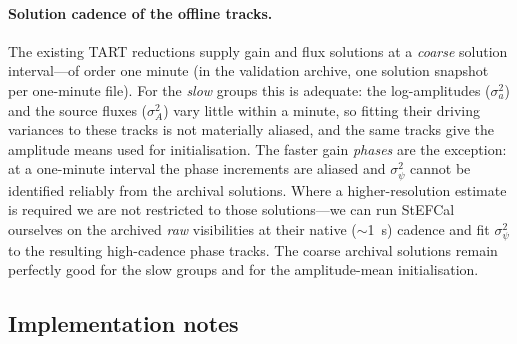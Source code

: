 \documentclass[11pt]{article}
\begin{document}
\paragraph{Solution cadence of the offline tracks.} The existing TART reductions supply gain and
flux solutions at a \emph{coarse} solution interval---of order one minute (in the validation
archive, one solution snapshot per one-minute file). For the \emph{slow} groups this is adequate:
the log-amplitudes ($\sigma_a^2$) and the source fluxes ($\sigma_A^2$) vary little within a minute,
so fitting their driving variances to these tracks is not materially aliased, and the same tracks
give the amplitude means used for initialisation. The faster gain \emph{phases} are the exception:
at a one-minute interval the phase increments are aliased and $\sigma_\psi^2$ cannot be identified
reliably from the archival solutions. Where a higher-resolution estimate is required we are not
restricted to those solutions---we can run StEFCal ourselves on the archived \emph{raw}
visibilities at their native ($\sim$1~s) cadence and fit $\sigma_\psi^2$ to the resulting
high-cadence phase tracks. The coarse archival solutions remain perfectly good for the slow groups
and for the amplitude-mean initialisation.

\subsection{Implementation notes}
\label{sec:notes}
\end{document}
